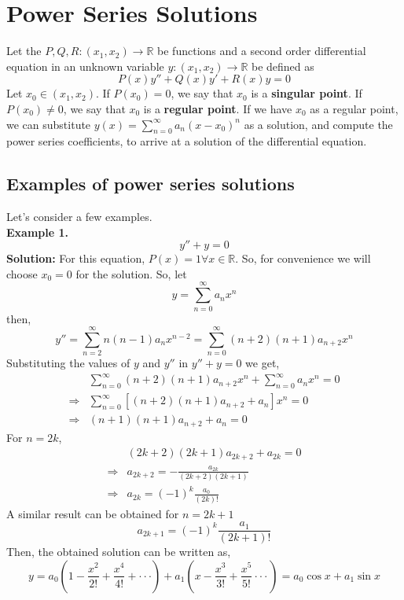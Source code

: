 \documentclass[10pt]{article}
\begin{document}
    \section{Power Series Solutions}
        Let the $P, Q, R : (x_1, x_2) \to \mathbb{R}$ be functions and a second order differential equation in an unknown variable $y: (x_1, x_2) \to \mathbb{R}$ be defined as $$P(x)y'' + Q(x)y' + R(x)y = 0$$
        Let $x_0 \in (x_1, x_2)$. If $P(x_0) = 0$, we say that $x_0$ is a \textbf{singular point}. If $P(x_0) \neq 0$, we say that $x_0$ is a \textbf{regular point}. If we have $x_0$ as a regular point, we can substitute $y(x) = \sum_{n=0}^\infty a_n(x-x_0)^n$ as a solution, and compute the power series coefficients, to arrive at a solution of the differential equation.
        \subsection{Examples of power series solutions}
        Let's consider a few examples. \\
        \textbf{Example 1.} \\
        $$y'' + y = 0$$
        \textbf{Solution: }For this equation, $P(x) = 1 \forall x \in \mathbb{R}$. So, for convenience we will choose $x_0 = 0$ for the solution. So, let $$y = \sum_{n=0}^\infty a_nx^n$$ then, 
        $$y'' = \sum_{n=2}^\infty n(n-1)a_nx^{n-2} = \sum_{n=0}^\infty (n+2)(n+1)a_{n+2}x^n$$
        Substituting the values of $y$ and $y''$ in $y'' + y = 0$ we get,
        \begin{align*}
            &\sum_{n=0}^\infty (n+2)(n+1)a_{n+2}x^n + \sum_{n=0}^\infty a_nx^n = 0 \\
            \Rightarrow &\sum_{n=0}^\infty [(n+2)(n+1)a_{n+2} + a_n]x^n = 0\\
            \Rightarrow &(n+1)(n+1)a_{n+2} + a_n = 0
        \end{align*}
        For $n = 2k$,
        \begin{align*}
            &(2k+2)(2k+1)a_{2k+2} + a_{2k} = 0 \\
            \Rightarrow &a_{2k+2} = -\frac{a_{2k}}{(2k+2)(2k+1)} \\
            \Rightarrow &a_{2k} = (-1)^k\frac{a_0}{(2k)!}
        \end{align*}
        A similar result can be obtained for $n = 2k + 1$ 
        $$a_{2k + 1} = (-1)^k \frac{a_1}{(2k+1)!}$$
        Then, the obtained solution can be written as, 
        $$y = a_0\left(1 - \frac{x^2}{2!} + \frac{x^4}{4!} + \cdot \cdot \cdot \right) + a_1\left(x - \frac{x^3}{3!} + \frac{x^5}{5!} \cdot \cdot \cdot \right) = a_0\cos x + a_1 \sin x$$
\end{document}
